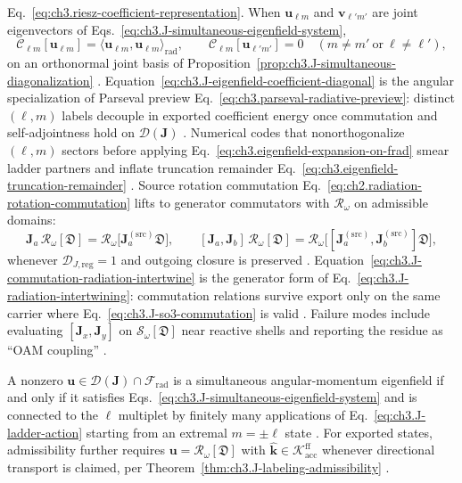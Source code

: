 Eq.~\eqref{eq:ch3.riesz-coefficient-representation}. When \(\mathbf{u}_{\ell m}\) and
\(\mathbf{v}_{\ell'm'}\) are joint eigenvectors of Eqs.~\eqref{eq:ch3.J-simultaneous-eigenfield-system},
\begin{equation}
\label{eq:ch3.J-eigenfield-coefficient-diagonal}
\mathcal{C}_{\ell m}[\mathbf{u}_{\ell m}]
=
\langle \mathbf{u}_{\ell m},\mathbf{u}_{\ell m}\rangle_{\mathrm{rad}},
\qquad
\mathcal{C}_{\ell m}[\mathbf{u}_{\ell'm'}]=0
\quad(m\neq m'\ \text{or}\ \ell\neq\ell'),
\end{equation}
on an orthonormal joint basis of Proposition~\ref{prop:ch3.J-simultaneous-diagonalization}
. Equation~\eqref{eq:ch3.J-eigenfield-coefficient-diagonal} is the angular
specialization of Parseval preview Eq.~\eqref{eq:ch3.parseval-radiative-preview}: distinct \((\ell,m)\) labels
decouple in exported coefficient energy once commutation and self-adjointness hold on
\(\mathcal{D}(\mathbf{J})\) . Numerical codes that nonorthogonalize \((\ell,m)\)
sectors before applying Eq.~\eqref{eq:ch3.eigenfield-expansion-on-frad} smear ladder partners and inflate
truncation remainder Eq.~\eqref{eq:ch3.eigenfield-truncation-remainder} .
Source rotation commutation Eq.~\eqref{eq:ch2.radiation-rotation-commutation} lifts to generator commutators
with \(\mathcal{R}_\omega\) on admissible domains:
\begin{equation}
\label{eq:ch3.J-commutation-radiation-intertwine}
\mathbf{J}_{a}\,\mathcal{R}_\omega[\mathfrak{D}]
=
\mathcal{R}_\omega\big[\mathbf{J}_{a}^{(\mathrm{src})}\mathfrak{D}\big],
\qquad
[\mathbf{J}_{a},\mathbf{J}_{b}]\,\mathcal{R}_\omega[\mathfrak{D}]
=
\mathcal{R}_\omega\big[[\mathbf{J}_{a}^{(\mathrm{src})},\mathbf{J}_{b}^{(\mathrm{src})}]\mathfrak{D}\big],
\end{equation}
whenever \(\mathcal{D}_{J,\mathrm{reg}}=1\) and outgoing closure is preserved .
Equation~\eqref{eq:ch3.J-commutation-radiation-intertwine} is the generator form of
Eq.~\eqref{eq:ch3.J-radiation-intertwining}: commutation relations survive export only on the same carrier where
Eq.~\eqref{eq:ch3.J-so3-commutation} is valid . Failure modes include
evaluating \([\mathbf{J}_{x},\mathbf{J}_{y}]\) on \(\mathcal{S}_\omega[\mathfrak{D}]\) near reactive shells
and reporting the residue as ``OAM coupling'' .
\begin{theorem}
\label{thm:ch3.simultaneous-eigenfield-char}
A nonzero \(\mathbf{u}\in\mathcal{D}(\mathbf{J})\cap\mathcal{F}_{\mathrm{rad}}\) is a simultaneous
angular-momentum eigenfield if and only if it satisfies Eqs.~\eqref{eq:ch3.J-simultaneous-eigenfield-system}
and is connected to the \(\ell\) multiplet by finitely many applications of
Eq.~\eqref{eq:ch3.J-ladder-action} starting from an extremal \(m=\pm\ell\) state .
For exported states, admissibility further requires \(\mathbf{u}=\mathcal{R}_\omega[\mathfrak{D}]\) with
\(\widehat{\mathbf{k}}\in\mathcal{K}_{\mathrm{acc}}^{\mathrm{ff}}\) whenever directional transport is claimed,
per Theorem~\ref{thm:ch3.J-labeling-admissibility} .
\end{theorem}
